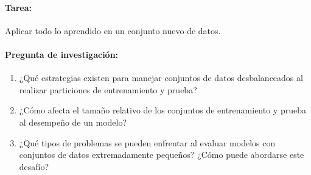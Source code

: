 \documentclass[a4,11pt]{aleph-notas}
\begin{document}
\paragraph{Tarea:} Aplicar todo lo aprendido en un conjunto nuevo de datos.
    
\paragraph{Pregunta de investigación:} 
\begin{enumerate}
    \item ¿Qué estrategias existen para manejar conjuntos de datos desbalanceados al realizar particiones de entrenamiento y prueba?
    \item ¿Cómo afecta el tamaño relativo de los conjuntos de entrenamiento y prueba al desempeño de un modelo?
    \item ¿Qué tipos de problemas se pueden enfrentar al evaluar modelos con conjuntos de datos extremadamente pequeños? ¿Cómo puede abordarse este desafío?
\end{enumerate}
    
\end{document}
